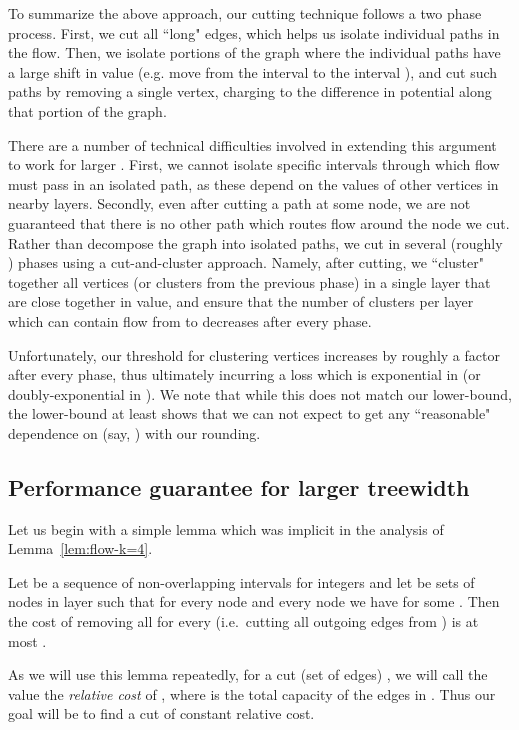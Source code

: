 To summarize the above approach, our cutting technique follows a two phase process. First, we cut all ``long" edges, which helps us isolate individual paths in the flow. Then, we isolate portions of the graph where the individual paths have a large shift in  value (e.g. move from the interval  to the interval ), and cut such paths by removing a single vertex, charging to the difference in potential along that portion of the graph.

There are a number of technical difficulties involved in extending this argument to work for larger . First, we cannot isolate specific intervals through which flow must pass in an isolated path, as these depend on the  values of other vertices in nearby layers. Secondly, even after cutting a path at some node, we are not guaranteed that there is no other path which routes flow around the node we cut. Rather than decompose the graph into isolated paths, we cut in several (roughly ) phases using a cut-and-cluster approach. Namely, after cutting, we ``cluster" together all vertices (or clusters from the previous phase) in a single layer that are close together in  value, and ensure that the number of clusters per layer which can contain flow from  to  decreases after every phase.

Unfortunately, our threshold for clustering vertices increases by roughly a  factor after every phase, thus ultimately incurring a loss which is exponential in  (or doubly-exponential in ). We note that while this does not match our  lower-bound, the lower-bound at least shows that we can not expect to get any ``reasonable" dependence on  (say, ) with our rounding.

\iffalse

\subsection{Performance guarantee for larger treewidth}

Let us begin with a simple lemma which was implicit in the analysis of Lemma~\ref{lem:flow-k=4}.

\begin{lemma}\label{lem:cut-charge} Let   be a sequence of non-overlapping intervals for integers  and let  be sets of nodes in layer  such that for every node  and every node  we have  for some . Then the cost of removing all  for every  (i.e.\ cutting all outgoing edges from ) is at most .
\end{lemma}

As we will use this lemma repeatedly, for a cut (set of edges) , we will call the value  the \emph{relative cost} of , where  is the total capacity of the edges in . Thus our goal will be to find a cut of constant relative cost.

